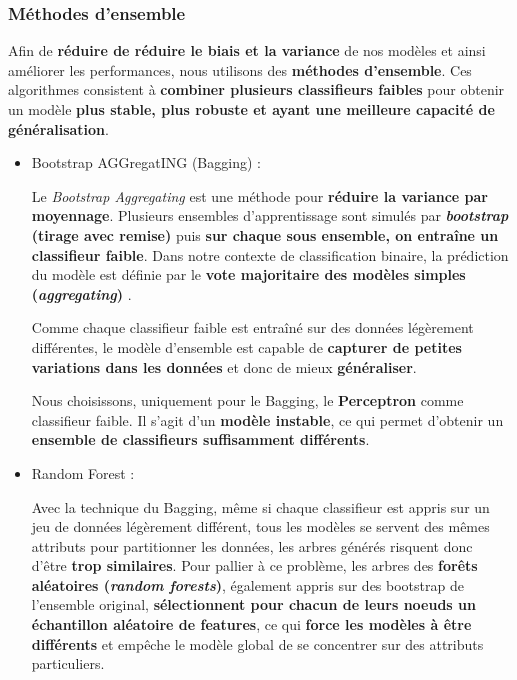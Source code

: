 \documentclass[12pt]{article}
\begin{document}
\subsubsection{Méthodes d'ensemble}

Afin de \textbf{réduire de réduire le biais et la variance} de nos modèles et
ainsi améliorer les performances, nous utilisons des \textbf{méthodes
d'ensemble}. Ces algorithmes consistent à \textbf{combiner plusieurs classifieurs
faibles} pour obtenir un modèle \textbf{plus stable, plus robuste et ayant une meilleure
capacité de généralisation}. \\

\begin{itemize}
    \item Bootstrap AGGregatING (Bagging) : 
        
        Le \emph{Bootstrap Aggregating} est une méthode pour \textbf{réduire la
        variance par moyennage}.  Plusieurs ensembles d'apprentissage sont
        simulés par \textbf{\emph{bootstrap} (tirage avec remise)} puis
        \textbf{sur chaque sous ensemble, on entraîne un classifieur faible}.
        Dans notre contexte de classification binaire, la prédiction du modèle
        est définie par le \textbf{vote majoritaire des modèles simples
        (\emph{aggregating})} .

Comme chaque classifieur faible est entraîné sur des données légèrement
différentes, le modèle d'ensemble est capable de \textbf{capturer de petites
variations dans les données} et donc de mieux \textbf{généraliser}. 

Nous choisissons, uniquement pour le Bagging, le \textbf{Perceptron} comme
classifieur faible. Il s'agit d'un \textbf{modèle instable}, ce qui permet
d'obtenir un \textbf{ensemble de classifieurs suffisamment différents}. \\

\item Random Forest : 
    
    Avec la technique du Bagging, même si chaque classifieur est appris sur un
        jeu de données légèrement différent, tous les modèles se servent des
        mêmes attributs pour partitionner les données, les arbres générés
        risquent donc d'être \textbf{trop similaires}. Pour pallier à ce
        problème, les arbres des \textbf{forêts aléatoires (\emph{random
        forests})}, également appris sur des bootstrap de l'ensemble original,
        \textbf{sélectionnent pour chacun de leurs noeuds un échantillon
        aléatoire de features}, ce qui \textbf{force les modèles à être
        différents} et empêche le modèle global de se concentrer sur des
        attributs particuliers. \\


\end{itemize}
\end{document}
